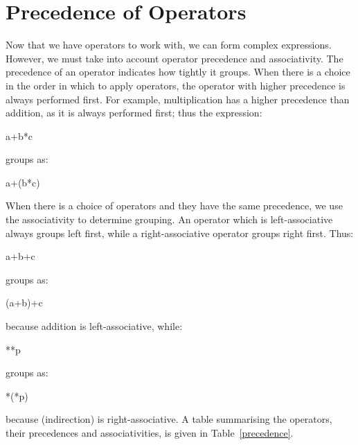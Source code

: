 \section{Precedence of Operators}
     Now that we have operators to work with, we can form complex
expressions.  However, we  must take into account  operator 
precedence and  associativity. The {\kc precedence} of  an
operator  indicates how tightly it groups. When there is a choice
in  the order  in which  to apply  operators, the  operator with
higher precedence is always performed first. For example,
multiplication has a higher precedence  than   addition,  as  it  is 
always  performed  first;  thus  the expression:
\begin{code}
a+b*c
\end{code}
\noindent
     groups as:
\begin{code}
a+(b*c)
\end{code}
\noindent
     When there is a choice of operators and they have the  same
precedence, we use the  associativity to  determine grouping. 
An  operator  which  is {\kc left-associative\/} always  groups left 
first,  while  a {\kc right-associative\/}  operator groups right
first. Thus:
\begin{code}
 a+b+c
\end{code}
\noindent
     groups as:
\begin{code}
 (a+b)+c
\end{code}
\noindent
     because addition is left-associative, while:
\begin{code}
 **p
\end{code}
\noindent
     groups as:
\begin{code}
 *(*p)
\end{code}
\noindent
     because  {\cd *}   (indirection)  is  right-associative.  A 
table summarising  the operators, their precedences and
associativities, is given in Table~\ref{precedence}.
